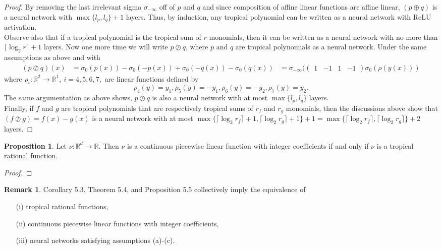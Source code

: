 \documentclass{article}
\theoremstyle{definition}
\newtheorem{proposition}[theorem]{Proposition}
\newtheorem{remark}[theorem]{Remark}
\begin{document}
\begin{proof}
By removing the last irrelevant sigma $\sigma_{- \infty}$ off of $p$ and $q$ and since composition of affine linear functions are affine linear, $(p\oplus q)$ is a neural network with $\max \{ l_{p}, l_{q} \} + 1$ layers. Thus, by induction, any tropical polynomial can be written as a neural network with ReLU activation. \\
Observe also that if a tropical polynomial is the tropical sum of $r$ monomials, then it can be written as a neural network with no more than
$\lceil \log_{2} r \rceil + 1$ layers. Now one more time we will write $p \oslash q$, where $p$ and $q$ are tropical polynomials as a neural network. Under the same assumptions as above and with
\begin{align*}
(p \oslash q)(x)
&= \sigma_{0}(p(x)) - \sigma_{0}(-p(x)) + \sigma_{0}(-q(x)) - \sigma_{0}(q(x))
&= \sigma_{- \infty }(\begin{pmatrix} 1 & -1 & 1 & -1 \end{pmatrix} \sigma_{0}(\rho(y(x)))
\end{align*}
where $\rho_{i}:\mathbb{R}^{2} \to \mathbb{R}^{1}, \ i=4,5,6,7,$ are linear functions defined by
$$\rho_{4}(y)=y_{1}, \rho_{5}(y)=-y_{1}, \rho_{6}(y)=-y_{2}, \rho_{7}(y)=y_{2}.$$
The same argumentation as above shows, $p \oslash q$ is also a neural network with at most $\max \{ l_{p}, l_{q} \}$ layers. \\
Finally, if $f$ and $g$ are tropical polynomials that are respectively tropical sums of $r_{f}$ and $r_{g}$ monomials, then the discussions
above show that $(f \oslash g) = f(x) - g(x)$ is a neural network with at most $\max \{ \lceil \log_{2}r_{f} \rceil + 1, \lceil \log_{2}r_g \rceil + 1 \} + 1 = \max \{ \lceil \log_{2}r_{f} \rceil, \lceil \log_{2}r_g \rceil \} + 2$ layers.


\end{proof}

\begin{proposition}\cite{zhang2018tropical}
Let $\nu : \mathbb{R}^{d} \to \mathbb{R}$. Then $\nu$ is a continuous piecewise linear function with integer coefficients if and only if $\nu$ is a tropical rational function.
\end{proposition}
\begin{proof}

\end{proof}

\begin{remark}\cite{zhang2018tropical}
Corollary 5.3, Theorem 5.4, and Proposition 5.5 collectively imply the equivalence of
\begin{itemize}
\item[(i)]
tropical rational functions,
\item[(ii)]
continuous piecewise linear functions with integer coefficients,
\item[(iii)]
neural networks satisfying assumptions (a)-(c).
\end{itemize}
\end{remark}
\end{document}
